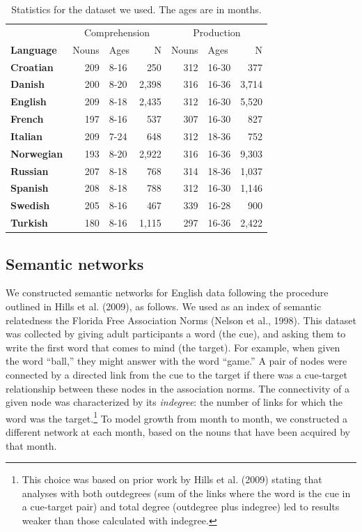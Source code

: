 \documentclass[english,floatsintext,man]{apa6}
\theoremstyle{definition}
\theoremstyle{definition}
\theoremstyle{definition}
\theoremstyle{remark}
\begin{document}
\begin{table}

\caption{\label{tab:stats}Statistics for the dataset we used. The ages are in months.}
\centering
\begin{tabular}[t]{>{\bfseries}lrlrrlr}
\toprule
\multicolumn{1}{c}{} & \multicolumn{3}{c}{Comprehension} & \multicolumn{3}{c}{Production} \\
\cmidrule(l{2pt}r{2pt}){2-4} \cmidrule(l{2pt}r{2pt}){5-7}
Language & Nouns & Ages & N & Nouns & Ages & N\\
\midrule
Croatian & 209 & 8-16 & 250 & 312 & 16-30 & 377\\
Danish & 200 & 8-20 & 2,398 & 316 & 16-36 & 3,714\\
English & 209 & 8-18 & 2,435 & 312 & 16-30 & 5,520\\
French & 197 & 8-16 & 537 & 307 & 16-30 & 827\\
Italian & 209 & 7-24 & 648 & 312 & 18-36 & 752\\
Norwegian & 193 & 8-20 & 2,922 & 316 & 16-36 & 9,303\\
Russian & 207 & 8-18 & 768 & 314 & 18-36 & 1,037\\
Spanish & 208 & 8-18 & 788 & 312 & 16-30 & 1,146\\
Swedish & 205 & 8-16 & 467 & 339 & 16-28 & 900\\
Turkish & 180 & 8-16 & 1,115 & 297 & 16-36 & 2,422\\
\bottomrule
\end{tabular}
\end{table}

\subsection{Semantic networks}\label{semantic-networks}

We constructed semantic networks for English data following the
procedure outlined in Hills et al. (2009), as follows. We used as an
index of semantic relatedness the Florida Free Association Norms (Nelson
et al., 1998). This dataset was collected by giving adult participants a
word (the cue), and asking them to write the first word that comes to
mind (the target). For example, when given the word \enquote{ball,} they
might answer with the word \enquote{game.} A pair of nodes were
connected by a directed link from the cue to the target if there was a
cue-target relationship between these nodes in the association norms.
The connectivity of a given node was characterized by its
\emph{indegree}: the number of links for which the word was the
target.\footnote{This choice was based on prior work by Hills et al. (2009) stating that analyses with both outdegrees (sum of the links where the word is the cue in a cue-target pair) and total degree  (outdegree plus indegree) led to results weaker than those calculated with indegree.}
To model growth from month to month, we constructed a different network
at each month, based on the nouns that have been acquired by that month.
\end{document}

